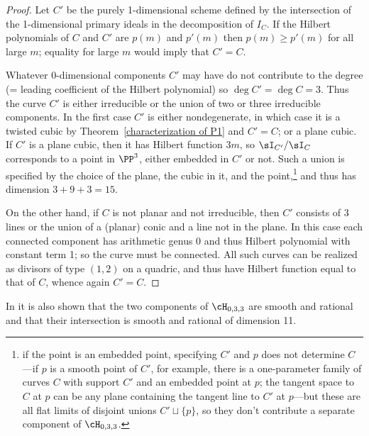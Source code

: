 \begin{proof}
Let $C'$ be the purely 1-dimensional scheme defined by the intersection of the 1-dimensional primary ideals in the decomposition of $I_C$. If the Hilbert polynomials of $C$ and $C'$ are $p(m)$ and  $p'(m)$ then
$p(m) \geq p'(m)$ for all large $m$; equality for large $m$ would imply that $C'=C$.

Whatever 0-dimensional components $C'$ may have do not contribute to the degree (= leading coefficient of the Hilbert polynomial) so $\deg C' = \deg C = 3$. Thus the curve $C'$ is either irreducible or the union of two or three irreducible components. In the first case $C'$ is either nondegenerate, in which case it is a twisted cubic by Theorem~\ref{characterization of P1} and $C' = C$; or a plane cubic. If $C'$ is a plane cubic, then it has Hilbert function $3m$, so $\sI_{C'}/\sI_C$
corresponds to a point in $\PP^3$, either embedded in $C'$ or not. Such a union is specified by the choice of the
plane, the cubic in it, and the point,\footnote{if the point is an embedded point, specifying $C'$ and $p$ does not determine $C$---if $p$ is a smooth point of $C'$, for example, there is a one-parameter family of curves $C$ with support $C'$ and an embedded point at $p$; the tangent space to $C$ at $p$ can be any plane containing the tangent line to $C'$ at $p$---but these are all flat limits of disjoint unions $C' \sqcup \{p\}$, so they don't contribute a separate component of $\cH_{0,3,3}$.} and thus has dimension $3+9+3 = 15.$

On the other hand, if $C$ is not planar and not irreducible, then $C'$ consists of 3 lines or the union of a (planar) conic
and a line not in the plane. In this case each connected component has arithmetic genus 0 and thus Hilbert polynomial
with constant term 1; so the curve must be connected. All such curves can be realized as divisors of type $(1,2)$
on a quadric, and thus have Hilbert function equal to that of $C$, whence again $C' = C$.
\end{proof}



\begin{fact}
In \cite{Piene-Schlessinger} it is also shown that the two components of $\cH_{0,3,3}$ are smooth and rational and that
their  intersection is  smooth and rational of dimension 11.
\end{fact}

